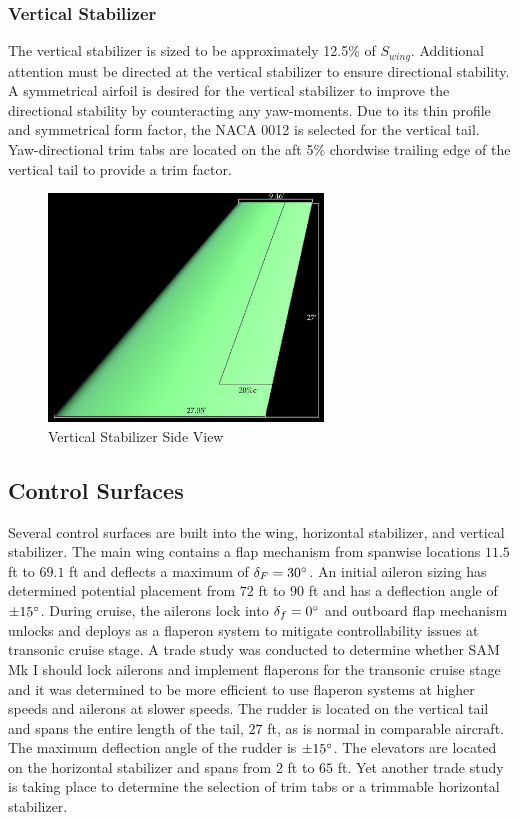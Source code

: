 \subsubsection{Vertical Stabilizer}
The vertical stabilizer is sized to be approximately 12.5\% of $S_{wing}$.  Additional attention must be directed at the vertical stabilizer to ensure directional stability.  A symmetrical airfoil is desired for the vertical stabilizer to improve the directional stability by counteracting any yaw-moments.  Due to its thin profile and symmetrical form factor, the NACA 0012 is selected for the vertical tail.  Yaw-directional trim tabs are located on the aft 5\% chordwise trailing edge of the vertical tail to provide a trim factor.

\begin{figure}[!h]
    \centering
    \includegraphics[width=0.65\textwidth]{Photos/stab/vtail.jpg}
    \caption{Vertical Stabilizer Side View}
    \label{fig:vtailstab}
\end{figure}

\subsection{Control Surfaces}
Several control surfaces are built into the wing, horizontal stabilizer, and vertical stabilizer.  The main wing contains a flap mechanism from spanwise locations $11.5$ ft to $69.1$ ft and deflects a maximum of $\delta_F = 30\degree$.  An initial aileron sizing has determined potential placement from $72$ ft to $90$ ft and has a deflection angle of $\pm 15\degree$.  During cruise, the ailerons lock into $\delta_f = 0\degree$ and outboard flap mechanism unlocks and deploys as a flaperon system to mitigate controllability issues at transonic cruise stage.  A trade study was conducted to determine whether SAM Mk I should lock ailerons and implement flaperons for the transonic cruise stage and it was determined to be more efficient to use flaperon systems at higher speeds and ailerons at slower speeds.  The rudder is located on the vertical tail and spans the entire length of the tail, $27$ ft, as is normal in comparable aircraft.  The maximum deflection angle of the rudder is $\pm 15\degree$.  The elevators are located on the horizontal stabilizer and spans from $2$ ft to $65$ ft.  Yet another trade study is taking place to determine the selection of trim tabs or a trimmable horizontal stabilizer.

